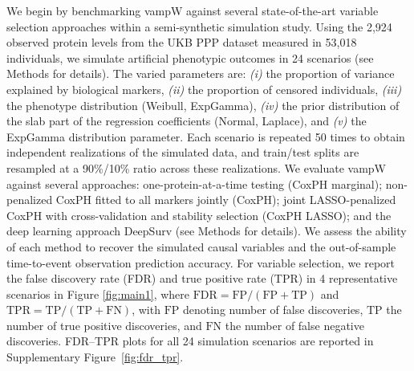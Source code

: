 We begin by benchmarking vampW against several state-of-the-art variable selection approaches within a semi-synthetic simulation study. Using the 2,924 observed protein levels from the UKB PPP dataset measured in 53,018 individuals, we simulate artificial phenotypic outcomes in 24 scenarios (see Methods for details). The varied parameters are: \emph{(i)} the proportion of variance explained by biological markers, \emph{(ii)} the proportion of censored individuals, \emph{(iii)} the phenotype distribution (Weibull, ExpGamma), \emph{(iv)} the prior distribution of the slab part of the regression coefficients (Normal, Laplace), and \emph{(v)} the ExpGamma distribution parameter. Each scenario is repeated 50 times to obtain independent realizations of the simulated data, and train/test splits are resampled at a 90\%/10\% ratio across these realizations. We evaluate vampW against several approaches: one-protein-at-a-time testing (CoxPH marginal); non-penalized CoxPH fitted to all markers jointly (CoxPH); joint LASSO-penalized CoxPH with cross-validation and stability selection (CoxPH LASSO); and the deep learning approach DeepSurv (see Methods for details). We assess the ability of each method to recover the simulated causal variables and the out-of-sample time-to-event observation prediction accuracy. For variable selection, we report the false discovery rate (FDR) and true positive rate (TPR) in 4 representative scenarios in Figure \ref{fig:main1}, where $\text{FDR} = \text{FP} / (\text{FP} + \text{TP})$ and $\text{TPR} = \text{TP} / (\text{TP} + \text{FN})$, with $\text{FP}$ denoting number of false discoveries, $\text{TP}$ the number of true positive discoveries, and $\text{FN}$ the number of false negative discoveries. FDR–TPR plots for all 24 simulation scenarios are reported in Supplementary Figure~\ref{fig:fdr_tpr}.

